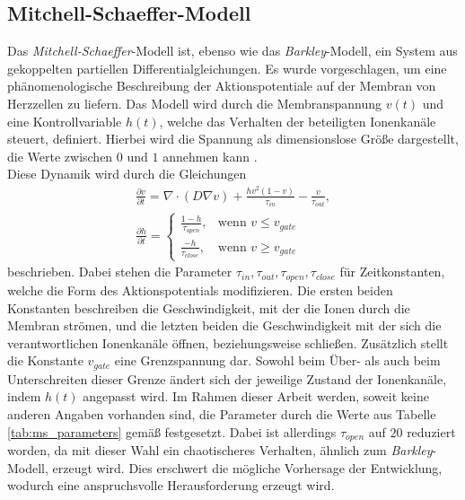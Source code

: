 \subsection{Mitchell-Schaeffer-Modell}
Das \textit{Mitchell-Schaeffer}-Modell ist, ebenso wie das \textit{Barkley}-Modell, ein System aus gekoppelten partiellen Differentialgleichungen. Es wurde vorgeschlagen, um eine phänomenologische Beschreibung der Aktionspotentiale auf der Membran von Herzzellen zu liefern. Das Modell wird durch die Membranspannung $v(t)$ und eine Kontrollvariable $h(t)$, welche das Verhalten der beteiligten Ionenkanäle steuert, definiert. Hierbei wird die Spannung als dimensionslose Größe dargestellt, die Werte zwischen $0$ und $1$ annehmen kann \citep{mitchell2003two}.\\

Diese Dynamik wird durch die Gleichungen 
\begin{equation}
\begin{gathered}
\frac{\partial v}{\partial t} = \nabla \cdot (D \nabla v) + \frac{h v^2(1-v)}{\tau_{in}} - \frac{v}{\tau_{out}},\\
\frac{\partial h}{\partial t} =
\begin{cases}
	\frac{1-h}{\tau_{open}},& \text{wenn } v \leq v_{gate}\\
    \frac{-h}{\tau_{close}},& \text{wenn } v \geq v_{gate}
\end{cases}
\end{gathered}
\end{equation}
beschrieben. Dabei stehen die Parameter $\tau_{in}, \tau_{out}, \tau_{open}, \tau_{close}$ für Zeitkonstanten, welche die Form des Aktionspotentials modifizieren. Die ersten beiden Konstanten beschreiben die Geschwindigkeit, mit der die Ionen durch die Membran strömen, und die letzten beiden die Geschwindigkeit mit der sich die verantwortlichen Ionenkanäle öffnen, beziehungsweise schließen. Zusätzlich stellt die Konstante $v_{gate}$ eine Grenzspannung dar. Sowohl beim Über- als auch beim Unterschreiten dieser Grenze ändert sich der jeweilige Zustand der Ionenkanäle, indem $h(t)$ angepasst wird. Im Rahmen dieser Arbeit werden, soweit keine anderen Angaben vorhanden sind, die Parameter durch die Werte aus Tabelle \ref{tab:ms_parameters} gemäß \citep{mitchell2003two} festgesetzt. Dabei ist allerdings $\tau_{open}$ auf $20$ \citep[S. 134ff.]{bartocci2016computational} reduziert worden, da mit dieser Wahl ein chaotischeres Verhalten, ähnlich zum \textit{Barkley}-Modell, erzeugt wird. Dies erschwert die mögliche Vorhersage der Entwicklung, wodurch eine anspruchsvolle Herausforderung erzeugt wird.\\


